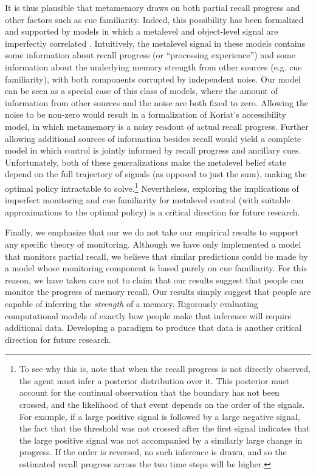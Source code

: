 It is thus plausible that metamemory draws on both partial recall progress and other factors such as cue familiarity. Indeed, this possibility has been formalized and supported by models in which a metalevel and object-level signal are imperfectly correlated \citep{fleming2017selfevaluation,jang2012stochastic,hu2021bayesian}. Intuitively, the metalevel signal in these models contains some information about recall progress (or ``processing experience'') and some information about the underlying memory strength from other sources (e.g. cue familiarity), with both components corrupted by independent noise. Our model can be seen as a special case of this class of models, where the amount of information from other sources and the noise are both fixed to zero. Allowing the noise to be non-zero would result in a formalization of Koriat's \citeyearpar{koriat1993how} accessibility model, in which metamemory is a noisy readout of actual recall progress. Further allowing additional sources of information besides recall would yield a complete model in which control is jointly informed by recall progress and ancillary cues. Unfortunately, both of these generalizations make the metalevel belief state depend on the full trajectory of signals (as opposed to just the sum), making the optimal policy intractable to solve.\footnote{%
  To see why this is, note that when the recall progress is not directly observed, the agent must infer a posterior distribution over it. This posterior must account for the continual observation that the boundary has not been crossed, and the likelihood of that event depends on the order of the signals. For example, if a large positive signal is followed by a large negative signal, the fact that the threshold was not crossed after the first signal indicates that the large positive signal was not accompanied by a similarly large change in progress. If the order is reversed, no such inference is drawn, and so the estimated recall progress across the two time steps will be higher.
} Nevertheless, exploring the implications of imperfect monitoring and cue familiarity for metalevel control (with suitable approximations to the optimal policy) is a critical direction for future research.

Finally, we emphasize that our we do not take our empirical results to support any specific theory of monitoring. Although we have only implemented a model that monitors partial recall, we believe that similar predictions could be made by a model whose monitoring component is based purely on cue familiarity. For this reason, we have taken care not to claim that our results suggest that people can monitor the progress of memory recall. Our results simply suggest that people are capable of inferring the \emph{strength} of a memory. Rigorously evaluating computational models of exactly how people make that inference will require additional data. Developing a paradigm to produce that data is another critical direction for future research.

